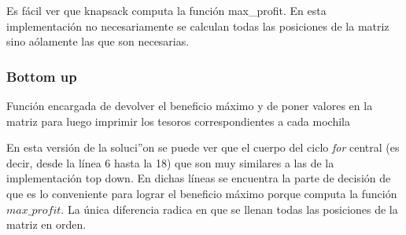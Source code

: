 \medskip

Es f\'acil ver que knapsack computa la funci\'on max\_profit.
En esta implementaci\'on no necesariamente se calculan todas las posiciones de la matriz sino a\'olamente las que son necesarias.

\subsubsection{Bottom up}

\medskip

\SetAlgoLined
{}
\begin{algorithm}[H]
	\label{algo: pseudocodigo_ej3}
	
	\caption{Función encargada de devolver el beneficio m\'aximo y de poner valores en la matriz para luego imprimir los tesoros correspondientes a cada mochila}
\end{algorithm}

\medskip

En esta versi\'on de la soluci''on se puede ver que el cuerpo del ciclo \emph{for} central (es decir, desde la l\'inea 6 hasta la 18) que son muy similares a las de la implementaci\'on top down. En dichas l\'ineas se encuentra la parte de decisi\'on de que es lo conveniente para lograr el beneficio m\'aximo porque computa la funci\'on $max\_profit$. La \'unica diferencia radica en que se llenan todas las posiciones de la matriz en orden.


